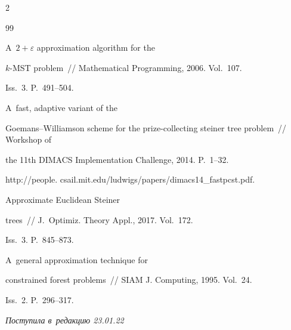 \begin{multicols}{2}
{{\begin{thebibliography}{99}

 A~$2+\varepsilon$ approximation algorithm for the 

$k$-MST problem~// Mathematical Programming, 2006. Vol.~107. 

Iss.~3. P.~491--504.




 A~fast, adaptive variant of the 

Goemans--Williamson scheme for the prize-collecting steiner tree problem~// Workshop of 

the 11th DIMACS Implementation Challenge, 2014. P.~1--32.

{\sf http://people. csail.mit.edu/ludwigs/papers/dimacs14\_fastpcst.pdf}.




 Approximate Euclidean Steiner 

trees~// J.~Optimiz. Theory Appl., 2017. Vol.~172. 

Iss.~3. P.~845--873.




 A~general approximation technique for 

constrained forest problems~// SIAM J. Computing, 1995. Vol.~24. 

Iss.~2. P.~296--317.

\end{thebibliography}



 }

 }



\end{multicols}



\vspace*{-6pt}



\hfill{\small\textit{Поступила в~редакцию 23.01.22}}



\vspace*{8pt}






